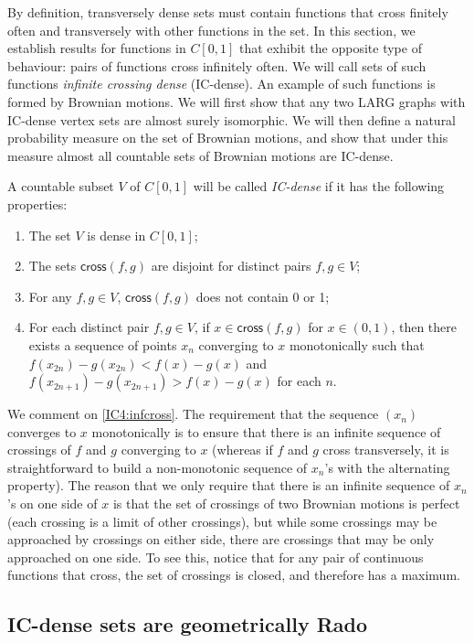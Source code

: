 \documentclass{daj}
\newcommand{\cross}{\mathsf{cross}}
\begin{document}
By definition, transversely dense sets must contain functions that cross finitely often and transversely
with other functions in the set. In this section, we establish results for functions in
$C[0,1]$ that exhibit the opposite type of behaviour: pairs of functions cross infinitely
often. We will call sets of such functions \emph{infinite crossing dense} (IC-dense).
An example of such functions is formed by Brownian motions. We will first show that any two
LARG graphs with IC-dense vertex sets are almost surely isomorphic. We will then define a
natural probability measure on the set of Brownian motions, and show that under this measure
almost all countable sets of Brownian motions are IC-dense.

A countable subset $V$ of $C[0,1]$
will be called \emph{IC-dense}  if it has the following properties:
\begin{enumerate}[label=(IC\arabic*)]
\item The set $V$ is dense in $C[0,1]$;\label{IC1:dense}
\item The sets $\cross(f,g)$ are disjoint for distinct pairs $f,g\in V$;
\label{IC2:notriple}
\item For any $f,g\in V$, $\cross(f,g)$ does not contain 0 or 1; \label{IC3:nocrossbdy}
\item For each distinct pair $f,g\in V$, if  $x\in\cross(f,g)$ for
$x\in (0,1)$, then there exists a sequence of points $x_n$ converging to $x$
monotonically such that $f(x_{2n})-g(x_{2n})<f(x)-g(x)$
and $f(x_{2n+1})-g(x_{2n+1})>f(x)-g(x)$ for each $n$.
\label{IC4:infcross}
\end{enumerate}
We comment on \ref{IC4:infcross}. The requirement that the
sequence $(x_n)$ converges to $x$ monotonically is
to ensure that there is an infinite sequence of crossings of $f$ and
$g$ converging to $x$ (whereas if $f$ and $g$
cross transversely, it is straightforward to build a non-monotonic sequence of $x_n$'s with the alternating property).
The reason that we only require that there is an infinite sequence of $x_n$'s
on one side of $x$ is that the set of crossings of two Brownian motions is perfect
(each crossing is a limit of other crossings), but while some crossings may be
approached by crossings on either side, there are crossings that may be only approached on one side.
To see this, notice that for any pair of
continuous functions that cross, the set of crossings is closed, and therefore has a maximum.

\subsection{IC-dense sets are geometrically Rado}
\end{document}
